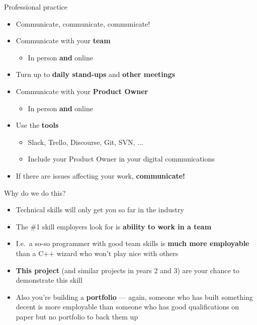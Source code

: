 \begin{frame}{Professional practice}
	\begin{itemize}
		\pause\item Communicate, communicate, communicate!
		\pause\item Communicate with your \textbf{team}
			\begin{itemize}
				\pause\item In person \textbf{and} online
			\end{itemize}
		\pause\item Turn up to \textbf{daily stand-ups} and \textbf{other meetings}
		\pause\item Communicate with your \textbf{Product Owner}
			\begin{itemize}
				\pause\item In person \textbf{and} online
			\end{itemize}
		\pause\item Use the \textbf{tools}
			\begin{itemize}
				\pause\item Slack, Trello, Discourse, Git, SVN, ...
				\pause\item Include your Product Owner in your digital communications
			\end{itemize}
		\pause\item If there are issues affecting your work, \textbf{communicate!}
	\end{itemize}
\end{frame}

\begin{frame}{Why do we do this?}
	\begin{itemize}
		\pause\item Technical skills will only get you so far in the industry
		\pause\item The \#1 skill employers look for is \textbf{ability to work in a team}
		\pause\item I.e.\ a so-so programmer with good team skills is \textbf{much more employable} than a C++ wizard who won't play nice with others
		\pause\item \textbf{This project} (and similar projects in years 2 and 3) are your chance to demonstrate this skill
		\pause\item Also you're building a \textbf{portfolio} --- again, someone who has built something decent
			is more employable than someone who has good qualifications on paper but no portfolio to back them up
	\end{itemize}
\end{frame}
